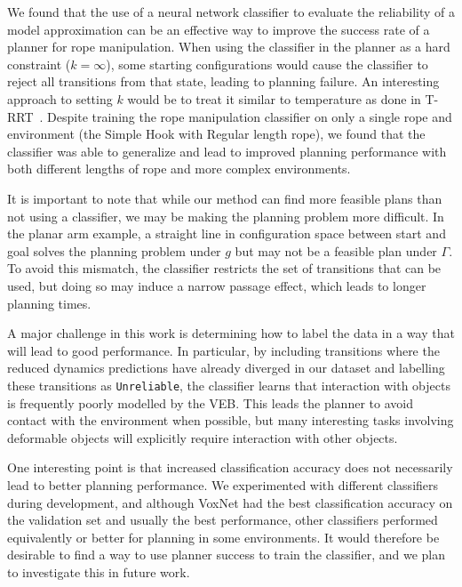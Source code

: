We found that the use of a neural network classifier to evaluate the reliability of a model approximation can be an effective way to improve the success rate of a planner for rope manipulation. When using the classifier in the planner as a hard constraint ($k = \infty$), some starting configurations would cause the classifier to reject all transitions from that state, leading to planning failure. An interesting approach to setting $k$ would be to treat it similar to temperature as done in T-RRT~\cite{Jaillet2008transition}. Despite training the rope manipulation classifier on only a single rope and environment (the Simple Hook with Regular length rope), we found that the classifier was able to generalize and lead to improved planning performance with both different lengths of rope and more complex environments. 

It is important to note that while our method can find more feasible plans than not using a classifier, we may be making the planning problem more difficult. In the planar arm example, a straight line in configuration space between start and goal solves the planning problem under $g$ but may not be a feasible plan under $\Gamma$. To avoid this mismatch, the classifier restricts the set of transitions that can be used, but doing so may induce a narrow passage effect, which leads to longer planning times.

A major challenge in this work is determining how to label the data in a way that will lead to good performance. In particular, by including transitions where the reduced dynamics predictions have already diverged in our dataset and labelling these transitions as \texttt{Unreliable}, the classifier learns that interaction with objects is frequently poorly modelled by the VEB. This leads the planner to avoid contact with the environment when possible, but many interesting tasks involving deformable objects will explicitly require interaction with other objects.

One interesting point is that increased classification accuracy does not necessarily lead to better planning performance. We experimented with different classifiers during development, and although VoxNet had the best classification accuracy on the validation set and usually the best performance, other classifiers performed equivalently or better for planning in some environments. It would therefore be desirable to find a way to use planner success to train the classifier, and we plan to investigate this in future work.


